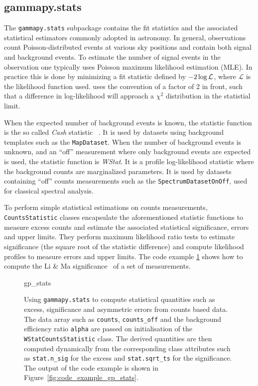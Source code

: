 \documentclass[longauth]{aa}
\newcommand{\code}[1]{\texttt{#1}}
\begin{document}
\subsection{gammapy.stats}
\label{ssec:gammapy-stats}
The \code{gammapy.stats} subpackage contains the fit statistics and the associated
statistical estimators commonly adopted in \gammaray astronomy. In
general, \gammaray observations count Poisson-distributed events at various sky
positions and contain both signal and background events.
To estimate the number of signal events in the observation one typically uses
Poisson maximum likelihood estimation (MLE). In practice this is done
by minimizing a fit statistic defined by $-2 \time\cdot \log{\mathcal{L}}$,
where $\mathcal{L}$ is the likelihood function used. \gammapy uses the convention
of a factor of 2 in front, such that a difference in log-likelihood will
approach a $\chi^2$ distribution in the statistial limit.

When the expected number of background events is known, the statistic function 
is the so called \emph{Cash} statistic ~\citep{Cash}. It is used by datasets using background
templates such as the
\code{MapDataset}. When the number of background events is unknown, and an \enquote{off}
measurement where only background events are expected is used, the statistic
function is \emph{WStat}. It is a profile log-likelihood statistic where the background
counts are marginalized parameters. It is used by datasets containing \enquote{off}
counts measurements such as the \code{SpectrumDatasetOnOff}, used for classical
spectral analysis.

To perform simple statistical estimations on counts measurements,
\code{CountsStatistic} classes encapsulate the aforementioned statistic functions to
measure excess counts and estimate the associated statistical significance,
errors and upper limits. They perform maximum likelihood ratio tests to
estimate significance (the square root of the statistic difference) and compute
likelihood profiles to measure errors and upper limits. The code example
\ref{fig*:minted:gp_stats} shows how to compute the Li \& Ma
significance~\citep{LiMa} of a set of measurements.

\begin{figure}
	\small
	{gp_stats}
	\caption{
        Using \code{gammapy.stats} to compute statistical quantities
        such as excess, significance and asymmetric errors
        from counts based data. The data array such as \code{counts}, \code{counts\_off}
		and the background efficiency ratio \code{alpha} are passed on initialisation
        of the \code{WStatCountsStatistic} class. The derived quantities
        are then computed dynamically from the corresponding class
        attributes such as \code{stat.n\_sig} for the excess
		and \code{stat.sqrt\_ts} for the significance.
		The output of the code example is shown in Figure~\ref{fig:code_example_gp_stats}.
    }
	\label{fig*:minted:gp_stats}
\end{figure}
\end{document}
